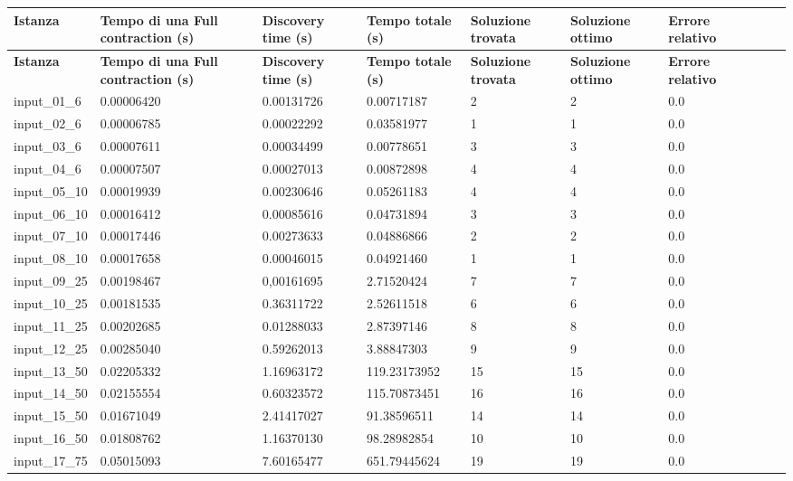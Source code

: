 \footnotesize
\begin{tabularx}{\textwidth}{*{10}{Y}}
    \toprule
    \textbf{Istanza} & \textbf{Tempo di una Full contraction (s)} & \textbf{Discovery time (s)} & \textbf{Tempo totale (s)} & \textbf{Soluzione trovata} & \textbf{Soluzione ottimo} & \textbf{Errore relativo}\\
    \endfirsthead
    \toprule
    \textbf{Istanza} & \textbf{Tempo di una Full contraction (s)} & \textbf{Discovery time (s)} & \textbf{Tempo totale (s)} & \textbf{Soluzione trovata} & \textbf{Soluzione ottimo} & \textbf{Errore relativo}\\
    \endhead
    \midrule
    input\_01\_6	&	0.00006420	&	0.00131726	&	0.00717187	&	2	&	2	&	0.0	\\\midrule
	input\_02\_6	&	0.00006785	&	0.00022292	&	0.03581977	&	1	&	1	&	0.0	\\\midrule
	input\_03\_6	&	0.00007611	&	0.00034499	&	0.00778651	&	3	&	3	&	0.0	\\\midrule
	input\_04\_6	&	0.00007507	&	0.00027013	&	0.00872898	&	4	&	4	&	0.0	\\\midrule
	input\_05\_10	&	0.00019939	&	0.00230646	&	0.05261183	&	4	&	4	&	0.0	\\\midrule
	input\_06\_10	&	0.00016412	&	0.00085616	&	0.04731894	&	3	&	3	&	0.0	\\\midrule
	input\_07\_10	&	0.00017446	&	0.00273633	&	0.04886866	&	2	&	2	&	0.0	\\\midrule
	input\_08\_10	&	0.00017658	&	0.00046015	&	0.04921460	&	1	&	1	&	0.0	\\\midrule
	input\_09\_25	&	0.00198467	&	0,00161695	&	2.71520424	&	7	&	7	&	0.0	\\\midrule
	input\_10\_25	&	0.00181535	&	0.36311722	&	2.52611518	&	6	&	6	&	0.0	\\\midrule
	input\_11\_25	&	0.00202685	&	0.01288033	&	2.87397146	&	8	&	8	&	0.0	\\\midrule
	input\_12\_25	&	0.00285040	&	0.59262013	&	3.88847303	&	9	&	9	&	0.0	\\\midrule
	input\_13\_50	&	0.02205332	&	1.16963172	&	119.23173952	&	15	&	15	 & 0.0	\\\midrule
	input\_14\_50	&	0.02155554	&	0.60323572	&	115.70873451	&	16	&	16	 & 0.0	\\\midrule
	input\_15\_50	&	0.01671049	&	2.41417027	&	91.38596511		&	14	&	14	 & 0.0	\\\midrule
	input\_16\_50	&	0.01808762	&	1.16370130	&	98.28982854		&	10	&	10	 & 0.0	\\\midrule
	input\_17\_75	&	0.05015093	&	7.60165477	&	651.79445624	&	19	&	19	 & 0.0	\\\midrule

\end{tabularx}
